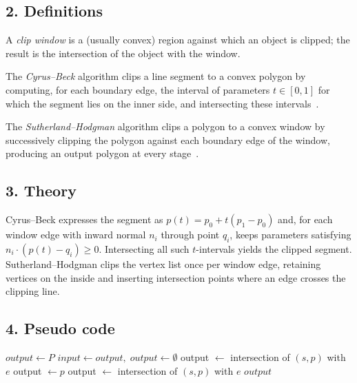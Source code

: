 \subsection{2. Definitions}

\begin{definition}\label{def:clip_window}
A \emph{clip window} is a (usually convex) region against which an object is clipped; the result is the intersection of the object with the window.
\end{definition}

\begin{definition}\label{def:cyrus_beck}
The \emph{Cyrus--Beck} algorithm clips a line segment to a convex polygon by computing, for each boundary edge, the interval of parameters $t \in [0,1]$ for which the segment lies on the inner side, and intersecting these intervals~\cite{cyrus1978}.
\end{definition}

\begin{definition}\label{def:sutherland_hodgman}
The \emph{Sutherland--Hodgman} algorithm clips a polygon to a convex window by successively clipping the polygon against each boundary edge of the window, producing an output polygon at every stage~\cite{sutherland1974}.
\end{definition}

\subsection{3. Theory}
Cyrus--Beck expresses the segment as $p(t) = p_0 + t(p_1 - p_0)$ and, for each window edge with inward normal $n_i$ through point $q_i$, keeps parameters satisfying $n_i \cdot (p(t) - q_i) \ge 0$. Intersecting all such $t$-intervals yields the clipped segment. Sutherland--Hodgman clips the vertex list once per window edge, retaining vertices on the inside and inserting intersection points where an edge crosses the clipping line.

\subsection{4. Pseudo code}
\begin{algorithmic}
    \State $output \gets P$
        \State $input \gets output,\; output \gets \emptyset$
                    \State output $\leftarrow$ intersection of $(s,p)$ with $e$
                \EndIf
                \State output $\leftarrow p$
                \State output $\leftarrow$ intersection of $(s,p)$ with $e$
            \EndIf
        \EndFor
    \EndFor
    \State \Return $output$
\EndFunction
\end{algorithmic}

